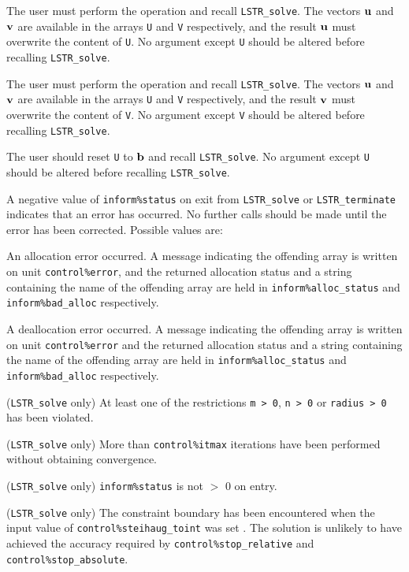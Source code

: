 \documentclass{galahad}
\newcommand{\packagename}{LS\-TR}
\begin{document}
\begin{description}

 The user must perform the operation
\disp{\bmu := \bmu + \bmA \bmv,}
and recall {\tt \packagename\_solve}.
The vectors ${\mathbf{u}}$ and ${\mathbf{v}}$ are available in the arrays {\tt U}
and {\tt V} respectively, and the result
${\mathbf{u}}$ must overwrite the content of {\tt U}.
No argument except {\tt U} should be altered before recalling
{\tt \packagename\_solve}.

 The user must perform the operation
and recall {\tt \packagename\_solve}.
The vectors ${\mathbf{u}}$ and ${\mathbf{v}}$ are available in the arrays {\tt U}
and {\tt V} respectively, and the result
${\mathbf{v}}$ must overwrite the content of {\tt V}.
No argument except {\tt V} should be altered before recalling
{\tt \packagename\_solve}.

  The user should reset {\tt U} to ${\mathbf{b}}$ and recall
{\tt \packagename\_solve}.
No argument except {\tt U} should be altered before recalling
{\tt \packagename\_solve}.

\end{description}


\galerrors
A negative value of  {\tt inform\%status} on exit from
{\tt \packagename\_solve}
or
{\tt \packagename\_terminate}
indicates that an error has occurred. No further calls should be made
until the error has been corrected. Possible values are:

\begin{description}
 An allocation error occurred. A message indicating
the offending
array is written on unit {\tt control\%error}, and the returned allocation
status and a string containing the name of the offending array
are held in {\tt inform\%alloc\_\-status}
and {\tt inform\%bad\_alloc} respectively.

 A deallocation error occurred.
A message indicating the offending
array is written on unit {\tt control\%error} and the returned allocation
status and a string containing the name of the offending array
are held in {\tt inform\%alloc\_\-status}
and {\tt inform\%bad\_alloc} respectively.

 ({\tt \packagename\_solve} only)
At least one of the restrictions
{\tt m > 0},
{\tt n > 0}
or
{\tt radius > 0}
has been violated.

 ({\tt \packagename\_solve} only) More than
{\tt control\%itmax} iterations have been performed without obtaining
convergence.

 ({\tt \packagename\_solve} only)  {\tt inform\%status} is
not $>$ 0 on entry.

 ({\tt \packagename\_solve} only)
The constraint boundary has been
encountered when the input value of {\tt control\%steihaug\-\_\-toint} was
set \true. The
solution is unlikely to have achieved the accuracy required by
{\tt control\%stop\_rela\-tive} and {\tt control\%stop\_absolute}.

\end{description}
\end{document}
